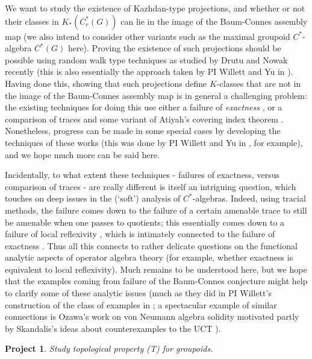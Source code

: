 \documentclass[11pt]{article}
\theoremstyle{plain}
\newtheorem{project}[theorem]{Project}
\theoremstyle{definition}
\theoremstyle{remark}
\begin{document}
We want to study the existence of Kazhdan-type projections, and whether or not their classes in $K_*(C^*_r(G))$ can lie in the image of the Baum-Connes assembly map (we also intend to consider other variants such as the maximal groupoid $C^*$-algebra $C^*(G)$ here).   Proving the existence of such projections should be possible using random walk type techniques as studied by Drutu and Nowak recently \cite{Drutu:2015aa} (this is also essentially the approach taken by PI Willett and Yu in \cite{Willett:2013cr}).  Having done this, showing that such projections define $K$-classes that are not in the image of the Baum-Connes assembly map is in general a challenging problem: the existing techniques for doing this use either a failure of \emph{exactness} \cite{Higson:2002la}, or a comparison of traces and some variant of Atiyah's covering index theorem \cite{Higson:1999km}.  Nonetheless, progress can be made in some special cases by developing the techniques of these works (this was done by PI Willett and Yu in \cite{Willett:2010ud}, for example), and we hope much more can be said here.

Incidentally, to what extent these techniques - failures of exactness, versus comparison of traces - are really different is itself an intriguing question, which touches on deep issues in the (`soft') analysis of $C^*$-algebras.  Indeed, using tracial methods, the failure comes down to the failure of a certain amenable trace \cite[Chapter 6]{Brown:2008qy} to still be amenable when one passes to quotients; this essentially comes down to a failure of local reflexivity \cite[Chapter 9]{Brown:2008qy}, which is intimately connected to the failure of exactness \cite[Chapter 5]{Brown:2008qy}.  Thus all this connects to rather delicate questions on the functional analytic aspects of operator algebra theory (for example, whether exactness is equivalent to local reflexivity).  Much remains to be understood here, but we hope that the examples coming from failure of the Baum-Connes conjecture might help to clarify some of these analytic issues (much as they did in PI Willett's construction of the class of examples in \cite{Spakula:2013ys}; a spectacular example of similar connections is Ozawa's \cite{Ozawa:2004bf} work on von Neumann algebra solidity motivated partly by Skandalis's ideas about counterexamples to the UCT \cite{Skandalis:1988rr}).


\begin{project}
Study topological property (T) for groupoids.
\end{project}
\end{document}
